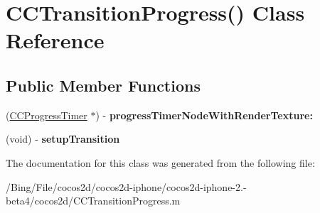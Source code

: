 \hypertarget{interface_c_c_transition_progress_07_08}{\section{C\-C\-Transition\-Progress() Class Reference}
\label{interface_c_c_transition_progress_07_08}
}
\subsection*{Public Member Functions}
\begin{DoxyCompactItemize}
\item 
\hypertarget{interface_c_c_transition_progress_07_08_a0c4a251c3a0713a7fdbe4420399ef2d8}{(\hyperlink{interface_c_c_progress_timer}{C\-C\-Progress\-Timer} $\ast$) -\/ {\bfseries progress\-Timer\-Node\-With\-Render\-Texture\-:}}\label{interface_c_c_transition_progress_07_08_a0c4a251c3a0713a7fdbe4420399ef2d8}

\item 
\hypertarget{interface_c_c_transition_progress_07_08_ac6c4192875e347b9ccaf041e67f036ec}{(void) -\/ {\bfseries setup\-Transition}}\label{interface_c_c_transition_progress_07_08_ac6c4192875e347b9ccaf041e67f036ec}

\end{DoxyCompactItemize}


The documentation for this class was generated from the following file\-:\begin{DoxyCompactItemize}
\item 
/\-Bing/\-File/cocos2d/cocos2d-\/iphone/cocos2d-\/iphone-\/2.-\/beta4/cocos2d/C\-C\-Transition\-Progress.\-m\end{DoxyCompactItemize}
